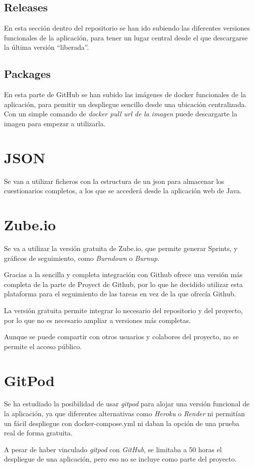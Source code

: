 \subsection{Releases}

En esta sección dentro del repositorio se han ido subiendo las diferentes versiones funcionales de la aplicación, para tener un lugar central desde el que descargarse la última versión ``liberada''.

\subsection{Packages}

En esta parte de GitHub se han subido las imágenes de docker funcionales de la aplicación, para pemitir un despliegue sencillo desde una ubicación centralizada.
Con un simple comando de \textit{docker pull url de la imagen} puede descargarte la imagen para empezar a utilizarla.

\section{JSON}

Se van a utilizar ficheros con la estructura de un json para almacenar los cuestionarios completos, a los que se accederá desde la aplicación web de Java.

\section{Zube.io}

Se va a utilizar la versión gratuita de Zube.io, que permite generar Sprints, y gráficos de seguimiento, como \textit{Burndown} o \textit{Burnup}.

Gracias a la sencilla y completa integración con Github ofrece una versión más completa de la parte de Proyect de Github, por lo que he decidido utilizar esta plataforma para el seguimiento de las tareas en vez de la que ofrecía Github.

La versión gratuita permite integrar lo necesario del repositorio y del proyecto, por lo que no es necesario ampliar a versiones más completas.

Aunque se puede compartir con otros usuarios y colabores del proyecto, no se permite el acceso público.

\section{GitPod}

Se ha estudiado la posibilidad de usar \textit{gitpod} para alojar una versión funcional de la aplicación, ya que diferentes alternativas como \textit{Heroku} o \textit{Render} ni permitían un fácil despliegue con docker-compose.yml ni daban la opción de una prueba real de forma gratuita.

A pesar de haber vinculado \textit{gitpod} con \textit{GitHub}, se limitaba a 50 horas el despliegue de una aplicación, pero eso no se incluye como parte del proyecto.








